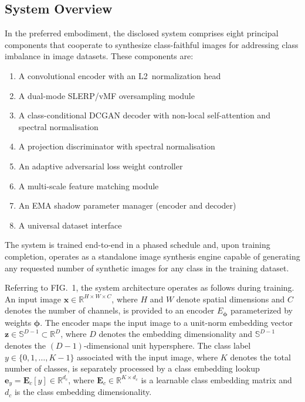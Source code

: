 \documentclass[12pt,letterpaper]{article}
\newcommand{\bz}{\mathbf{z}}
\newcommand{\bx}{\mathbf{x}}
\newcommand{\bphi}{\bm{\phi}}
\newcommand{\RR}{\mathbb{R}}
\newcommand{\Sphere}{\mathbb{S}}
\begin{document}
\subsection{System Overview}

In the preferred embodiment, the disclosed system comprises eight principal
components that cooperate to synthesize class-faithful images for addressing
class imbalance in image datasets.  These components are:

\begin{enumerate}[label=\textbf{(\arabic*)},leftmargin=2em]
  \item A convolutional encoder with an L2~normalization head
  \item A dual-mode SLERP/vMF oversampling module
  \item A class-conditional DCGAN decoder with non-local self-attention and spectral normalisation
  \item A projection discriminator with spectral normalisation
  \item An adaptive adversarial loss weight controller
  \item A multi-scale feature matching module
  \item An EMA shadow parameter manager (encoder and decoder)
  \item A universal dataset interface
\end{enumerate}

The system is trained end-to-end in a phased schedule and, upon training
completion, operates as a standalone image synthesis engine capable of
generating any requested number of synthetic images for any class in the
training dataset.

Referring to FIG.~1, the system architecture operates as follows during
training.  An input image $\bx \in \RR^{H \times W \times C}$, where $H$
and $W$ denote spatial dimensions and $C$ denotes the number of channels, is
provided to an encoder $E_{\bphi}$ parameterized by weights $\bphi$.  The
encoder maps the input image to a unit-norm embedding vector
$\bz \in \Sphere^{D-1} \subset \RR^D$, where $D$ denotes the embedding
dimensionality and $\Sphere^{D-1}$ denotes the $(D-1)$-dimensional unit
hypersphere.  The class label $y \in \{0, 1, \ldots, K-1\}$ associated with
the input image, where $K$ denotes the total number of classes, is separately
processed by a class embedding lookup
$\bm{e}_y = \mathbf{E}_c[y] \in \RR^{d_c}$, where
$\mathbf{E}_c \in \RR^{K \times d_c}$ is a learnable class embedding matrix
and $d_c$ is the class embedding dimensionality.
\end{document}
